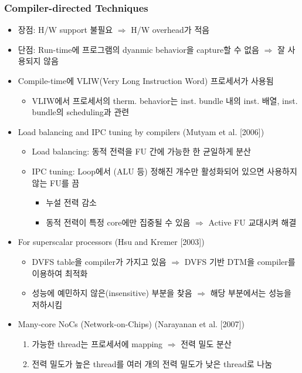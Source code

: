 \subsubsection*{Compiler-directed Techniques}
\begin{itemize}
    \item 장점: H/W support 불필요 $\Rightarrow$ H/W overhead가 적음
    \item 단점: Run-time에 프로그램의 dyanmic behavior을 capture할 수 없음 $\Rightarrow$ 잘 사용되지 않음
    \item Compile-time에 VLIW(Very Long Instruction Word) 프로세서가 사용됨
    \begin{itemize}
        \item VLIW에서 프로세서의 therm. behavior는 inst. bundle 내의 inst. 배열, inst. bundle의 scheduling과 관련
    \end{itemize}
    \item Load balancing and IPC tuning by compilers (Mutyam et al. [2006])
    \begin{itemize}
        \item Load balancing: 동적 전력을 FU 간에 가능한 한 균일하게 분산
        \item IPC tuning: Loop에서 (ALU 등) 정해진 개수만 활성화되어 있으면 사용하지 않는 FU를 끔
        \begin{itemize}
            \item 누설 전력 감소
            \item 동적 전력이 특정 core에만 집중될 수 있음 $\Rightarrow$ Active FU 교대시켜 해결
        \end{itemize}
    \end{itemize}
    \item For superscalar processors (Hsu and Kremer [2003])
    \begin{itemize}
        \item DVFS table을 compiler가 가지고 있음 $\Rightarrow$ DVFS 기반 DTM을 compiler를 이용하여 최적화
        \item 성능에 예민하지 않은(insensitive) 부분을 찾음 $\Rightarrow$ 해당 부분에서는 성능을 저하시킴
    \end{itemize}
    \item Many-core NoCs (Network-on-Chips) (Narayanan et al. [2007])
    \begin{enumerate}
        \item 가능한 thread는 프로세서에 mapping $\Rightarrow$ 전력 밀도 분산
        \item 전력 밀도가 높은 thread를 여러 개의 전력 밀도가 낮은 thread로 나눔
    \end{enumerate}
\end{itemize}

